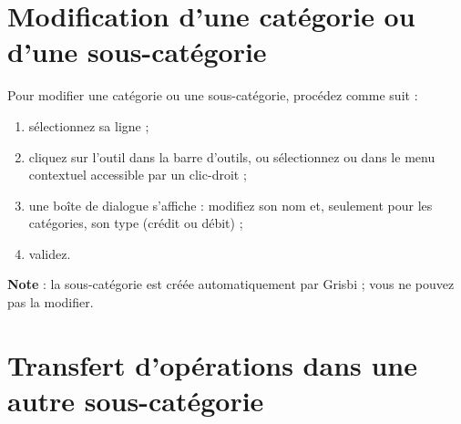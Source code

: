 \ifIllustration
\newpage
\fi


\section{Modification d'une catégorie ou d'une sous-catégorie\label{categories-modify}}


Pour modifier une catégorie ou une sous-catégorie, procédez comme suit :

\begin{enumerate}	
	\ifIllustration
	\pichskip{8mm}
	\label{categories-infos-img}
	\fi
	 \item sélectionnez sa ligne ;
	 \item cliquez sur l'outil  dans la barre d'outils, ou sélectionnez  ou  dans le menu contextuel accessible par un  clic-droit ;
	 \item une boîte de dialogue s'affiche : modifiez son nom et, seulement pour les catégories, son type (crédit ou débit) ;
	 \item validez.
\end{enumerate}


\textbf{Note} : la sous-catégorie  est créée automatiquement par Grisbi ; vous ne pouvez pas la modifier.


\section{Transfert d'opérations dans une autre sous-catégorie\label{categories-transfer}}

